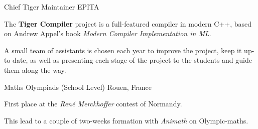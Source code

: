 \documentclass[letterpaper]{twentysecondcv} %
\begin{document}
\begin{twenty}

    {Chief Tiger Maintainer}
    {EPITA}
    {The \textbf{Tiger Compiler} project is a full-featured compiler in modern
    C++, based on Andrew Appel's book \textit{Modern Compiler Implementation
    in ML}.

    A small team of assistants is chosen each year to improve the project, keep
    it up-to-date, as well as presenting each stage of the project to the
    students and guide them along the way.}

    {Maths Olympiads (School Level)}
    {Rouen, France}
    {First place at the \textit{René Merckhoffer} contest of Normandy.

    This lead to a couple of two-weeks formation with \textit{Animath} on
    Olympic-maths.}

\end{twenty}










\end{document}
